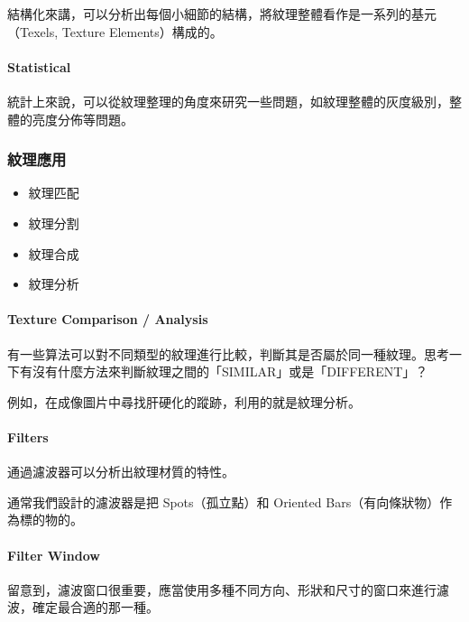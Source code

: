 \documentclass[
]{article}
\begin{document}
結構化來講，可以分析出每個小細節的結構，將紋理整體看作是一系列的基元（Texels,
Texture Elements）構成的。

\hypertarget{header-n16}{%
\paragraph{Statistical}\label{header-n16}}

統計上來說，可以從紋理整理的角度來研究一些問題，如紋理整體的灰度級別，整體的亮度分佈等問題。

\hypertarget{header-n19}{%
\subsubsection{紋理應用}\label{header-n19}}

\begin{itemize}
\item
  紋理匹配
\item
  紋理分割
\item
  紋理合成
\item
  紋理分析
\end{itemize}

\hypertarget{header-n29}{%
\paragraph{Texture Comparison / Analysis}\label{header-n29}}

有一些算法可以對不同類型的紋理進行比較，判斷其是否屬於同一種紋理。思考一下有沒有什麼方法來判斷紋理之間的「SIMILAR」或是「DIFFERENT」？

例如，在成像圖片中尋找肝硬化的蹤跡，利用的就是紋理分析。

\hypertarget{header-n32}{%
\paragraph{Filters}\label{header-n32}}

通過濾波器可以分析出紋理材質的特性。

通常我們設計的濾波器是把 Spots（孤立點）和 Oriented
Bars（有向條狀物）作為標的物的。

\hypertarget{header-n35}{%
\paragraph{Filter Window}\label{header-n35}}

留意到，濾波窗口很重要，應當使用多種不同方向、形狀和尺寸的窗口來進行濾波，確定最合適的那一種。
\end{document}
